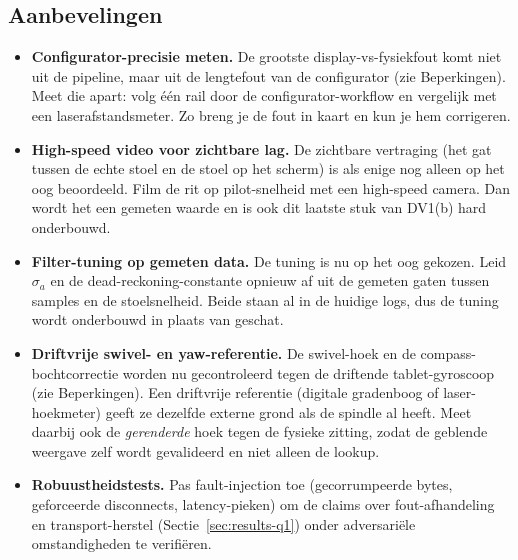 \documentclass[10pt, a4paper, twocolumn]{article}
\begin{document}
\subsection{Aanbevelingen}
\begin{itemize}[leftmargin=*]
  \item \textbf{Configurator-precisie meten.} De grootste display-vs-fysiekfout
    komt niet uit de pipeline, maar uit de lengtefout van de configurator (zie
    Beperkingen). Meet die apart: volg één rail door de configurator-workflow en
    vergelijk met een laserafstandsmeter. Zo breng je de fout in kaart en kun je
    hem corrigeren.
  \item \textbf{High-speed video voor zichtbare lag.} De zichtbare vertraging (het
    gat tussen de echte stoel en de stoel op het scherm) is als enige nog alleen op
    het oog beoordeeld. Film de rit op pilot-snelheid met een high-speed camera. Dan wordt het een gemeten waarde en is ook dit laatste stuk van DV1(b)
    hard onderbouwd.
  \item \textbf{Filter-tuning op gemeten data.} De tuning is nu op het oog gekozen.
    Leid $\sigma_a$ en de dead-reckoning-constante opnieuw af
    uit de gemeten gaten tussen samples en de stoelsnelheid. Beide staan al in de
    huidige logs, dus de tuning wordt onderbouwd in plaats van geschat.
  \item \textbf{Driftvrije swivel- en yaw-referentie.} De swivel-hoek en de
    compass-bochtcorrectie worden nu gecontroleerd tegen de driftende
    tablet-gyroscoop (zie Beperkingen). Een driftvrije referentie (digitale
    gradenboog of laser-hoekmeter) geeft ze dezelfde externe grond als de spindle
    al heeft. Meet daarbij ook de \emph{gerenderde} hoek tegen de fysieke zitting,
    zodat de geblende weergave zelf wordt gevalideerd en niet alleen de lookup.
  \item \textbf{Robuustheidstests.} Pas fault-injection toe (gecorrumpeerde bytes,
    geforceerde disconnects, latency-pieken) om de claims over fout-afhandeling en
    transport-herstel (Sectie~\ref{sec:results-q1}) onder adversariële
    omstandigheden te verifiëren.
\end{itemize}
\end{document}
